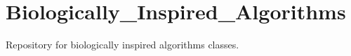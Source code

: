 \chapter{Biologically\+\_\+\+Inspired\+\_\+\+Algorithms}
\hypertarget{md_README}{}\label{md_README}
\label{md_README_autotoc_md0}%
%


Repository for biologically inspired algorithms classes. 